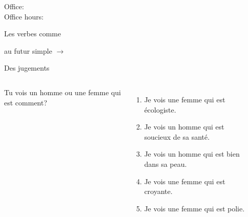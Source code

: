 \documentclass{beamer}
\subtitle[Caractéristiques, \lexi{voir} et \lexi{que}]{Les caractéristiques, \lexi{voir} et la conjonction \lexi{que}}
\begin{document}
  \begin{frame}
    \titlepage
    \tiny{Office: \\
          Office hours: }
  \end{frame}

  \begin{frame}{Les verbes comme }
    \begin{center}
      
    \end{center}
     au futur simple $\to$ 
  \end{frame}

  \begin{frame}{Des jugements}
    \begin{columns}
        Tu vois un homme ou une femme qui est comment?
        \begin{enumerate}
          \item<2-> Je vois une femme qui est \alert{écologiste}.
          \item<4-> Je vois un homme qui est \alert{soucieux de sa santé}.
          \item<6-> Je vois un homme qui est \alert{bien dans sa peau}.
          \item<8-> Je vois une femme qui est \alert{croyante}.
          \item<10-> Je vois une femme qui est \alert{polie}.
        \end{enumerate}
        \begin{minipage}[c][0.8\textheight]{\linewidth}
          \begin{center}
          \end{center}
        \end{minipage}
    \end{columns}
  \end{frame}
\end{document}
